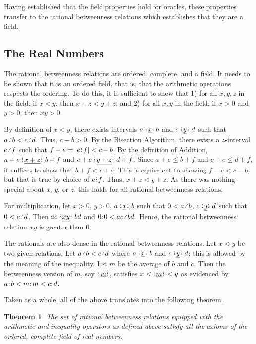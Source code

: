 \documentclass[12pt]{article}
\newtheorem{theorem}{Theorem}[section]
\begin{document}
Having established that the field properties hold for oracles, these properties transfer to the rational betweenness relations which establishes that they are a field. 


\subsection{The Real Numbers}

The rational betweenness relations are ordered, complete, and a field. It needs to be shown that it is an ordered field, that is, that the arithmetic operations respects the ordering. To do this, it is sufficient to show that 1) for all $x, y, z$ in the field, if $x<y$, then $x + z < y +z$; and 2) for all $x, y$ in the field, if $x >0$ and $y>0$, then $xy > 0 $.

By definition of $x < y$, there exists intervals $ a \xrel[x] b$ and $c \xrel[y] d$ such that $a \lte b < c \lte d$. Thus, $c-b > 0$. By the Bisection Algorithm, there exists a $z$-interval $e \lte f$ such that $f-e = |e\rint f| < c-b$. By the definition of Addition, $a+e \xrel[x+z] b+f$ and $c+e \xrel[y+z] d+f$. Since $a+e \leq  b+f$ and $c+e \leq d+f$, it suffices to show that $b+f < c+e$. This is equivalent to showing $f-e < c-b$, but that is true by choice of $e\rint f$. Thus, $x+z < y+z$. As there was nothing special about $x$, $y$, or $z$, this holds for all rational betweenness relations. 

For multiplication, let $x >0 $, $y >0$, $a \xrel b$ such that $0<a \lte b$, $c \xrel[y] d$ such that $0 < c \lte d$. Then $ac \xrel[xy] bd$ and $0\rint 0 < ac \lte bd$. Hence, the rational betweenness relation $xy$ is greater than 0. 

The rationals are also dense in the rational betweenness relations. Let $x < y$ be two given relations. Let $a \lte b < c \lte d$ where $a \xrel b$ and $c \xrel[y] d$; this is allowed by the meaning of the inequality. Let $m$ be the average of $b$ and $c$. Then the betweenness version of $m$, say $\xrel[m]$, satisfies $x < \xrel[m] < y$ as evidenced by $a\rint b < m\rint m < c\rint d$.

Taken as a whole, all of the above translates into the following theorem.

\begin{theorem}
    The set of rational betweenness relations equipped with the arithmetic and inequality operators as defined above satisfy all the axioms of the ordered, complete field of real numbers. 
\end{theorem}
\end{document}
